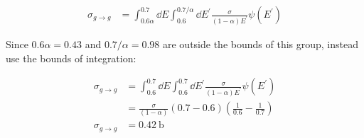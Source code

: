 \documentclass{hw}
\begin{document}
\solution

\begin{align*}
\sigma_{g \rightarrow g} &= \int_{0.6 \alpha}^{0.7} \dd{E} \int_{0.6}^{0.7 / \alpha} \dd{E^\prime} \frac{\sigma}{(1 - \alpha) E^\prime}\psi(E^\prime)
\end{align*}

Since $0.6 \alpha = 0.43$ and $0.7/\alpha = 0.98$ are outside the bounds of this group, instead use the bounds of integration:

\begin{align*}
\sigma_{g\rightarrow g} &= \int_{0.6}^{0.7} \dd{E} \int_{0.6}^{0.7} \dd{E^\prime} \frac{\sigma}{(1 - \alpha) E^\prime}\psi(E^\prime) \\
&= \frac{\sigma}{(1 - \alpha)} (0.7 - 0.6) (\frac{1}{0.6} - \frac{1}{0.7}) \\
\sigma_{g\rightarrow g} &= \SI{0.42}{\barn}
\end{align*}
\end{document}

